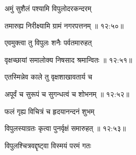 {\devanagarifont अमुं सुशैलं पश्यामि विपुलोदरकन्दरम् \thinspace{\dandab} \dontdisplaylinenum }%


{\devanagarifont तमारुह्य निरीक्ष्यामि ग्रामं नगरपत्तनम् {॥ १२:५०॥} \veg\dontdisplaylinenum }%

{\devanagarifont एवमुक्त्वा तु विपुलः शनैः पर्वतमारुहत् \thinspace{\dandab} \dontdisplaylinenum }%


{\devanagarifont वृक्षच्छायां समालोक्य निषसाद श्रमान्वितः {॥ १२:५१॥} \veg\dontdisplaylinenum }%

{\devanagarifont एतस्मिन्नेव काले तु वृक्षशाखावतार्य च \thinspace{\dandab} \dontdisplaylinenum }%


{\devanagarifont अपूर्वं च सुरूपं च सुगन्धत्वं च शोभनम् {॥ १२:५२॥} \veg\dontdisplaylinenum }%

{\devanagarifont फलं गृह्य विचित्रं च हृदयानन्दनं शुभम् \thinspace{\dandab} \dontdisplaylinenum }%
 

{\devanagarifont विपुलस्याग्रतः कृत्वा पुनर्वृक्षं समारुहत् {॥ १२:५३॥} \veg\dontdisplaylinenum }%

{\devanagarifont विपुलश्चित्रवद्दृष्ट्वा विस्मयं परमं गतः \thinspace{\dandab} \dontdisplaylinenum }%


